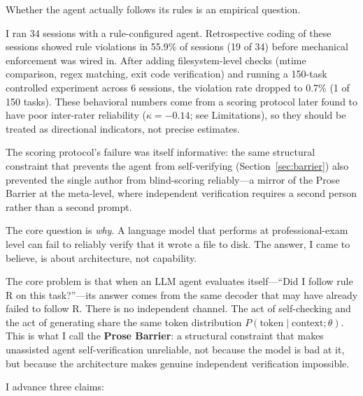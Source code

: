 \documentclass[11pt]{article}
\begin{document}
Whether the agent actually follows its rules is an empirical question.

I ran 34 sessions with a rule-configured agent. Retrospective coding of these
sessions showed rule violations in 55.9\% of sessions (19 of 34) before
mechanical enforcement was wired in. After adding filesystem-level checks
(mtime comparison, regex matching, exit code verification) and running a
150-task controlled experiment across 6 sessions, the violation rate dropped to
0.7\% (1 of 150 tasks). These behavioral numbers come from a scoring protocol
later found to have poor inter-rater reliability ($\kappa=-0.14$; see
Limitations), so they should be treated as directional indicators, not precise
estimates.

The scoring protocol's failure was itself informative: the same structural
constraint that prevents the agent from self-verifying (Section~\ref{sec:barrier})
also prevented the single author from blind-scoring reliably---a mirror of the
Prose Barrier at the meta-level, where independent verification requires a second
person rather than a second prompt.

The core question is \textit{why}. A language model that performs at professional-exam level
can fail to reliably verify that it wrote a file to disk. The answer, I came to
believe, is about architecture, not capability.

The core problem is that when an LLM agent evaluates itself---``Did I follow
rule R on this task?''---its answer comes from the same decoder that may have
already failed to follow R. There is no independent channel. The act of
self-checking and the act of generating share the same token distribution
$P(\text{token} \mid \text{context}; \theta)$. This is what I call the
\textbf{Prose Barrier}: a structural constraint that makes unassisted agent
self-verification unreliable, not because the model is bad at it, but because
the architecture makes genuine independent verification impossible.

I advance three claims:
\end{document}
